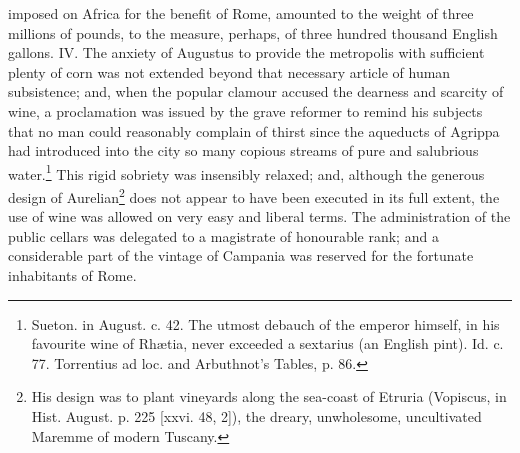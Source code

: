imposed on Africa for the benefit of Rome, amounted to the weight of three millions of pounds, to the measure, perhaps, of three hundred thousand English gallons. IV. The anxiety of Augustus to provide the metropolis with sufficient plenty of corn was not extended beyond that necessary article of human subsistence; and, when the popular clamour accused the dearness and scarcity of wine, a proclamation was issued by the grave reformer to remind his subjects that no man could reasonably complain of thirst since the aqueducts of Agrippa had introduced into the city so many copious streams of pure and salubrious water.\footnote{Sueton. in August. c. 42. The utmost debauch of the emperor himself, in his favourite wine of Rhætia, never exceeded a sextarius (an English pint). Id. c. 77. Torrentius ad loc. and Arbuthnot\texthebrew{}’s Tables, p. 86.} This rigid sobriety was insensibly relaxed; and, although the generous design of Aurelian\footnote{His design was to plant vineyards along the sea-coast of Etruria (Vopiscus, in Hist. August. p. 225 [xxvi. 48, 2]), the dreary, unwholesome, uncultivated Maremme of modern Tuscany.} does not appear to have been executed in its full extent, the use of wine was allowed on very easy and liberal terms. The administration of the public cellars was delegated to a magistrate of honourable rank; and a considerable part of the vintage of Campania was reserved for the fortunate inhabitants of Rome.

